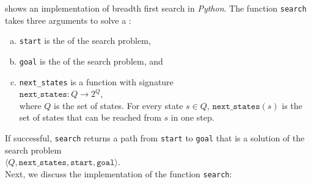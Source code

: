  shows an implementation of
breadth first search in \textsl{Python}.  The function \texttt{search} takes three arguments to solve a
: 
\begin{enumerate}[(a)]
\item \texttt{start} is the  of the search problem,
\item \texttt{goal} is the  of the search problem, and
\item \texttt{next\_states} is a function with signature      
      \\[0.2cm]
      \hspace*{1.3cm}
      $\texttt{next\_states}:Q \rightarrow 2^Q$, 
      \\[0.2cm]
      where $Q$ is the set of states. For every state $s \in Q$, $\texttt{next\_states}(s)$ 
      is the set of states that can be reached from $s$ in one step.
\end{enumerate}
If successful, \texttt{search} returns a path from \texttt{start} to \texttt{goal} that is a solution of the
search problem 
\\[0.2cm]
\hspace*{1.3cm}
$\langle Q, \texttt{next\_states}, \texttt{start}, \texttt{goal} \rangle$.
\\[0.2cm]
Next, we discuss the implementation of the function \texttt{search}:
